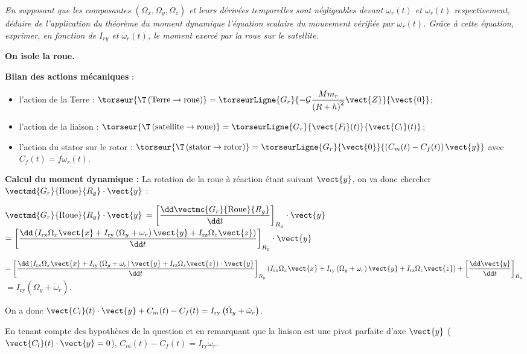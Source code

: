 \question{\label{q_13}}\textit{
  En supposant que les composantes $\left(\Omega_x,\Omega_y,\Omega_z\right)$ et leurs dérivées temporelles sont
  négligeables devant $\omega_r(t)$ et $\dot{\omega}_r(t)$ respectivement, déduire de l'application du
  théorème du moment dynamique l'équation scalaire du mouvement vérifiée
  par $\omega_r(t)$. Grâce à cette équation, exprimer, en fonction de $I_{ry}$ et $\dot{\omega_r}(t)$, le moment exercé par la roue sur le satellite.}
\ifprof
\begin{corrige}
\textbf{On isole la roue.}

\textbf{Bilan des actions mécaniques} :
\begin{itemize}
\item l'action de la Terre : $
\torseur{\T\left(\text{Terre}\to \text{roue}\right)}=\torseurLigne{G_r}{-\mathcal{G}\dfrac{Mm_r}{\left(R+h\right)^2}\vect{Z}}{\vect{0}}$;   
\item l'action de la liaison : 
$\torseur{\T\left(\text{satellite}\to \text{roue}\right)}=\torseurLigne{G_r}{\vect{F_l}(t)}{\vect{C_l}(t)} $;
  \item l'action du stator sur le rotor :
  $\torseur{\T\left(\text{stator}\to \text{rotor}\right)}=\torseurLigne{G_r}{\vect{0}}{\left(C_m(t)-C_f(t)\right)\vect{y}}
$ avec $C_f (t)=f \omega_r(t)$.
\end{itemize}

\textbf{Calcul du moment dynamique :}
La rotation de la roue à réaction étant suivant $\vect{y}$, on va donc chercher $\vectmd{G_r}{\text{Roue}}{R_g}\cdot \vect{y}$ :

$\vectmd{G_r}{\text{Roue}}{R_g}\cdot \vect{y}$ 
$=\left[\dfrac{\dd \vectmc{G_r}{\text{Roue}}{R_g}}{\dd t}\right]_{R_g}\cdot \vect{y}$ 
$=\left[ \dfrac{\dd   \left( I_{\text{rx}} \Omega_x \vect{x}+  I_{\text{ry}}\left( \Omega_y + \omega_r \right) \vect{y}+  I_{\text{rz}}\Omega_z \vect{z} \right)}{\dd t}\right]_{R_g}\cdot \vect{y}$ 

$=\left[ \dfrac{\dd   \left( I_{\text{rx}} \Omega_x \vect{x}+  I_{\text{ry}}\left( \Omega_y + \omega_r \right) \vect{y}+  I_{\text{rz}}\Omega_z \vect{z} \right)\cdot \vect{y}}{\dd t}\right]_{R_g}
\left( I_{\text{rx}} \Omega_x \vect{x}+  I_{\text{ry}}\left( \Omega_y + \omega_r \right) \vect{y}+  I_{\text{rz}}\Omega_z \vect{z} \right) +\left[ \dfrac{\dd   \vect{y}}{\dd t}\right]_{R_g}$ 
$ =I_{\text{ry}}\left( \dot{\Omega}_y + \dot{\omega}_r \right)$.

On a donc $\vect{C_l}(t)\cdot \vect{y} + C_m(t)-C_f(t)  =  I_{\text{ry}}\left( \dot{\Omega}_y + \dot{\omega}_r \right)$.


En tenant compte des hypothèses de la question et en remarquant que la liaison est une pivot parfaite d'axe $\vect{y}$ ($\vect{C_l}(t)\cdot\vect{y} = 0$), 
$C_m(t)-C_f(t) = I_{\text{ry}}\dot{\omega}_r$.


\end{corrige}
\else
\fi


